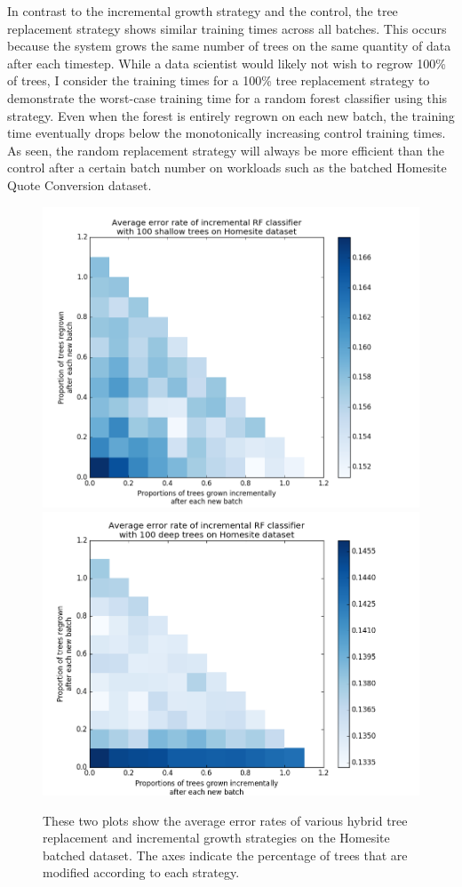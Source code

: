 In contrast to the incremental growth strategy and the control, the tree
replacement strategy shows similar training times across all batches. This
occurs because the system grows the same number of trees on the same quantity
of data after each timestep. While a data scientist would likely not wish to
regrow 100\% of trees, I consider the training times for a 100\% tree
replacement strategy to demonstrate the worst-case training time for a random
forest classifier using this strategy. Even when the forest is entirely regrown
on each new batch, the training time eventually drops below the monotonically
increasing control training times. As seen, the random replacement strategy
will always be more efficient than the control after a certain batch number on
workloads such as the batched Homesite Quote Conversion dataset.

\begin{figure} 
  \centering 
  \includegraphics[width=5.0in]{homesite_shallow}
  \includegraphics[width=5.0in]{homesite_deep} 
  \caption{These two plots show
    the average error rates of various hybrid tree replacement and incremental
    growth strategies on the Homesite batched dataset. The axes indicate the
percentage of trees that are modified according to each strategy.}
  \label{fig:homesitehybrid} 
\end{figure}

